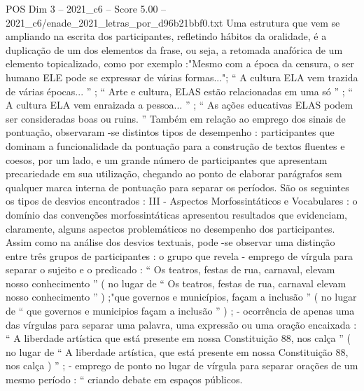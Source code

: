 \begin{textsample}{POS Dim 3 – 2021\_c6 – Score 5.00 – 2021\_c6/enade\_2021\_letras\_por\_d96b21bbf0.txt}
Uma estrutura que vem se ampliando na escrita dos participantes, refletindo hábitos da oralidade, é a duplicação de um dos elementos da frase, ou seja, a retomada anafórica de um elemento topicalizado, como por exemplo :"Mesmo com a época da censura, o ser humano ELE pode se expressar de várias formas..."; “ A cultura ELA vem trazida de várias épocas... ” ; “ Arte e cultura, ELAS estão relacionadas em uma só ” ; “ A cultura ELA vem enraizada a pessoa... ” ; “ As ações educativas ELAS podem ser consideradas boas ou ruins. ” Também em relação ao emprego dos sinais de pontuação, observaram -se distintos tipos de desempenho : participantes que dominam a funcionalidade da pontuação para a construção de textos fluentes e coesos, por um lado, e um grande número de participantes que apresentam precariedade em sua utilização, chegando ao ponto de elaborar parágrafos sem qualquer marca interna de pontuação para separar os períodos.
São os seguintes os tipos de desvios encontrados : III - Aspectos Morfossintáticos e Vocabulares : o domínio das convenções morfossintáticas apresentou resultados que evidenciam, claramente, alguns aspectos problemáticos no desempenho dos participantes.
Assim como na análise dos desvios textuais, pode -se observar uma distinção entre três grupos de participantes : o grupo que revela - emprego de vírgula para separar o sujeito e o predicado : “ Os teatros, festas de rua, carnaval, elevam nosso conhecimento ” ( no lugar de “ Os teatros, festas de rua, carnaval elevam nosso conhecimento ” ) ;"que governos e municípios, façam a inclusão ” ( no lugar de “ que governos e municipios façam a inclusão ” ) ; - ocorrência de apenas uma das vírgulas para separar uma palavra, uma expressão ou uma oração encaixada : “ A liberdade artística que está presente em nossa Constituição 88, nos calça ” ( no lugar de “ A liberdade artística, que está presente em nossa Constituição 88, nos calça ) ” ; - emprego de ponto no lugar de vírgula para separar orações de um mesmo período : “ criando debate em espaços públicos.

\end{textsample}
